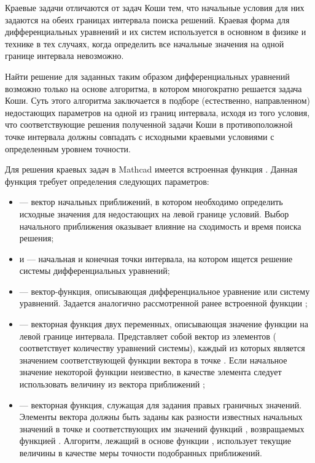 Краевые задачи отличаются от задач Коши тем, что начальные условия для них задаются на обеих границах интервала поиска решений. Краевая форма для дифференциальных уравнений и их систем используется в основном в физике и технике в тех случаях, когда определить все начальные значения на одной границе интервала невозможно. 

Найти решение для заданных таким образом дифференциальных уравнений возможно только на основе алгоритма, в котором многократно решается задача Коши. Суть этого алгоритма заключается в подборе (естественно, направленном) недостающих параметров на одной из границ интервала, исходя из того условия, что соответствующие решения полученной задачи Коши в противоположной точке интервала должны совпадать с исходными краевыми условиями с определенным уровнем точности.

Для решения краевых задач в Mathcad имеется встроенная функция . Данная функция требует определения следующих параметров:
\begin{itemize}[label={}]
	\item {} --- вектор начальных приближений, в котором необходимо определить исходные значения для недостающих на левой границе условий. Выбор начального приближения оказывает влияние на сходимость и время поиска решения;
	\item {} и  --- начальная и конечная точки интервала, на котором ищется решение системы дифференциальных уравнений;
	\item {} --- вектор-функция, описывающая дифференциальное уравнение или систему уравнений. Задается аналогично рассмотренной ранее встроенной функции ;
	\item {} --- векторная функция двух переменных, описывающая значение функции на левой границе интервала. Представляет собой вектор из  элементов ( соответствует количеству уравнений системы), каждый из которых является значением соответствующей функции вектора  в точке . Если начальное значение некоторой функции неизвестно, в качестве элемента  следует использовать величину из вектора приближений ;
	\item {} --- векторная функция, служащая для задания правых граничных значений. Элементы вектора  должны быть заданы как разности известных начальных значений в точке  и соответствующих им значений функций , возвращаемых функцией . Алгоритм, лежащий в основе функции , использует текущие величины  в качестве меры точности подобранных приближений. 
\end{itemize}

